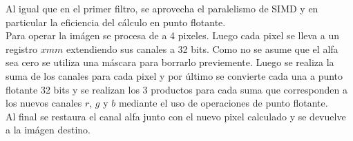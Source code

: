 Al igual que en el primer filtro, se aprovecha el paralelismo de SIMD y en particular la eficiencia del cálculo en punto flotante.\\

Para operar la imágen se procesa de a 4 pixeles. Luego cada pixel se lleva a un registro $xmm$ extendiendo sus canales a 32 bits. Como no se asume que el alfa sea cero se utiliza una máscara para borrarlo previemente. Luego se realiza la suma de los canales para cada pixel y por último se convierte cada una a punto flotante 32 bits y se realizan los 3 productos para cada suma que corresponden a los nuevos canales $r$, $g$ y $b$ mediante el uso de operaciones de punto flotante.\\

Al final se restaura el canal alfa junto con el nuevo pixel calculado y se devuelve a la imágen destino. 

